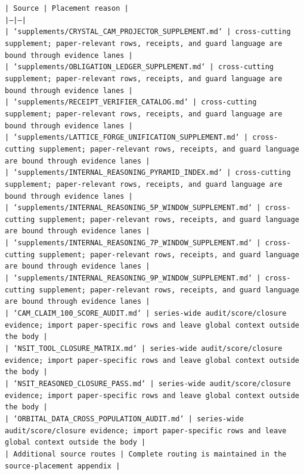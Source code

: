\documentclass[11pt]{article}
\begin{document}
\noindent\texttt{| Source | Placement reason |}\\
\noindent\texttt{|---|---|}\\
\noindent\texttt{| `supplements/CRYSTAL\_CAM\_PROJECTOR\_SUPPLEMENT.md` | cross-cutting supplement; paper-relevant rows, receipts, and guard language are bound through evidence lanes |}\\
\noindent\texttt{| `supplements/OBLIGATION\_LEDGER\_SUPPLEMENT.md` | cross-cutting supplement; paper-relevant rows, receipts, and guard language are bound through evidence lanes |}\\
\noindent\texttt{| `supplements/RECEIPT\_VERIFIER\_CATALOG.md` | cross-cutting supplement; paper-relevant rows, receipts, and guard language are bound through evidence lanes |}\\
\noindent\texttt{| `supplements/LATTICE\_FORGE\_UNIFICATION\_SUPPLEMENT.md` | cross-cutting supplement; paper-relevant rows, receipts, and guard language are bound through evidence lanes |}\\
\noindent\texttt{| `supplements/INTERNAL\_REASONING\_PYRAMID\_INDEX.md` | cross-cutting supplement; paper-relevant rows, receipts, and guard language are bound through evidence lanes |}\\
\noindent\texttt{| `supplements/INTERNAL\_REASONING\_5P\_WINDOW\_SUPPLEMENT.md` | cross-cutting supplement; paper-relevant rows, receipts, and guard language are bound through evidence lanes |}\\
\noindent\texttt{| `supplements/INTERNAL\_REASONING\_7P\_WINDOW\_SUPPLEMENT.md` | cross-cutting supplement; paper-relevant rows, receipts, and guard language are bound through evidence lanes |}\\
\noindent\texttt{| `supplements/INTERNAL\_REASONING\_9P\_WINDOW\_SUPPLEMENT.md` | cross-cutting supplement; paper-relevant rows, receipts, and guard language are bound through evidence lanes |}\\
\noindent\texttt{| `CAM\_CLAIM\_100\_SCORE\_AUDIT.md` | series-wide audit/score/closure evidence; import paper-specific rows and leave global context outside the body |}\\
\noindent\texttt{| `NSIT\_TOOL\_CLOSURE\_MATRIX.md` | series-wide audit/score/closure evidence; import paper-specific rows and leave global context outside the body |}\\
\noindent\texttt{| `NSIT\_REASONED\_CLOSURE\_PASS.md` | series-wide audit/score/closure evidence; import paper-specific rows and leave global context outside the body |}\\
\noindent\texttt{| `ORBITAL\_DATA\_CROSS\_POPULATION\_AUDIT.md` | series-wide audit/score/closure evidence; import paper-specific rows and leave global context outside the body |}\\
\noindent\texttt{| Additional source routes | Complete routing is maintained in the source-placement appendix |}\\
\end{document}
